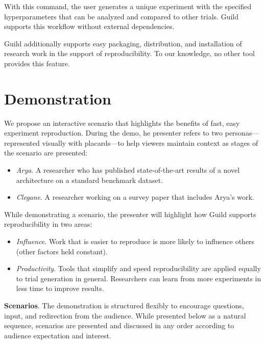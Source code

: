 \documentclass{article}
\begin{document}
With this command, the user generates a unique experiment with the
specified hyperparameters that can be analyzed and compared to other
trials. Guild supports this workflow without external dependencies.

Guild additionally supports easy packaging, distribution, and
installation of research work in the support of reproducibility. To
our knowledge, no other tool provides this feature.

\section{Demonstration}

We propose an interactive scenario that highlights the benefits of
fast, easy experiment reproduction. During the demo, he presenter
refers to two personas---represented visually with placards---to help
viewers maintain context as stages of the scenario are presented:

\begin{itemize}[topsep=0pt, itemsep=0pt]
\item \emph{Arya}. A researcher who has published state-of-the-art
  results of a novel architecture on a standard benchmark dataset.
\item \emph{Clegane}. A researcher working on a survey paper that
  includes Arya's work.
\end{itemize}

While demonstrating a scenario, the presenter will highlight how Guild
supports reproducibility in two areas:

\begin{itemize}[topsep=0pt, itemsep=0pt]
\item \emph{Influence}. Work that is easier to reproduce is more
  likely to influence others (other factors held constant).

\item \emph{Productivity}. Tools that simplify and speed
  reproducibility are applied equally to trial generation in general.
  Researchers can learn from more experiments in less time to improve
  results.
\end{itemize}

\textbf{Scenarios}. The demonstration is structured flexibly to
encourage questions, input, and redirection from the audience. While
presented below as a natural sequence, scenarios are presented and
discussed in any order according to audience expectation and interest.
\end{document}
